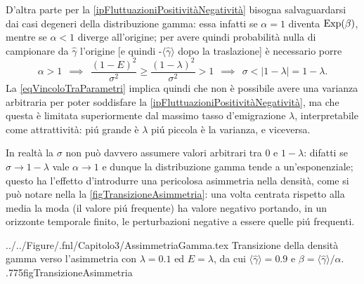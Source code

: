                 D'altra parte per la \ref{ipFluttuazioniPositivitàNegatività} bisogna salvaguardarsi dai casi degeneri della distribuzione gamma: essa infatti se \(\alpha=1\) diventa \(\operatorname{Exp}(\beta)\), mentre se \(\alpha<1\) diverge all'origine; per avere quindi probabilità nulla di campionare da \(\hat\gamma\) l'origine [e quindi -\(\langle\hat\gamma\rangle\) dopo la traslazione] è necessario porre
                \begin{equation}
                    \label{eqVincoloTraParametri}
                    \alpha>1
                    \ \ \implies\ \ 
                    \frac{(1-E)^2}{\sigma^2}\geq
                    \frac{(1-\lambda)^2}{\sigma^2}>1
                    \ \ \implies\ \ 
                    \sigma<\vert1-\lambda\vert=1-\lambda.
                \end{equation}
                La \eqref{eqVincoloTraParametri} implica quindi che non è possibile avere una varianza arbitraria per poter soddisfare la \ref{ipFluttuazioniPositivitàNegatività}, ma che questa è limitata superiormente dal massimo tasso d'emigrazione \(\lambda\), interpretabile come attrattività: piú grande è \(\lambda\) piú piccola è la varianza, e viceversa.

                In realtà la \(\sigma\) non può davvero assumere valori arbitrari tra \(0\) e \(1-\lambda\): difatti se \(\sigma\to1-\lambda\) vale \(\alpha\to1\) e dunque la distribuzione gamma tende a un'esponenziale; questo ha l'effetto d'introdurre una pericolosa asimmetria nella densità, come si può notare nella la \cref{figTransizioneAsimmetria}: una volta centrata rispetto alla media la moda (il valore piú frequente) ha valore negativo portando, in un orizzonte temporale finito, le perturbazioni negative a essere quelle piú frequenti.

                    {../../Figure/.fnl/Capitolo3/AssimmetriaGamma.tex}
                    {Transizione della densità gamma verso l'asimmetria con \(\lambda=0.1\) ed \(E=\lambda\), da cui \(\langle\hat\gamma\rangle=0.9\) e \(\beta=\langle\hat\gamma\rangle/\alpha\).}
                    {.775\linewidth}{figTransizioneAsimmetria}

